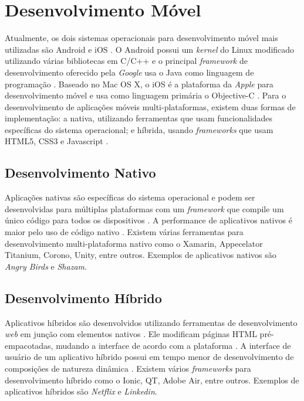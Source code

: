 \section{Desenvolvimento Móvel}

Atualmente, os dois sistemas operacionais para desenvolvimento móvel mais utilizadas são Android e iOS \cite{gartner-top-os}. O Android possui um \textit{kernel} do Linux modificado utilizando várias bibliotecas em C/C++ \cite{mobile-dev} e o principal \textit{framework} de desenvolvimento oferecido pela \textit{Google} usa o Java como linguagem de programação \cite{android}. Baseado no Mac OS X, o iOS é a plataforma da \textit{Apple} para desenvolvimento móvel e usa como linguagem primária o Objective-C \cite{mobile-dev}. Para o desenvolvimento de aplicações móveis multi-plataformas, existem duas formas de implementação: a nativa, utilizando ferramentas que usam funcionalidades específicas do sistema operacional; e híbrida, usando \textit{frameworks} que usam HTML5, CSS3 e Javascript \cite{mobile-dev-2}.

\subsection{Desenvolvimento Nativo}

Aplicações nativas são específicas do sistema operacional e podem ser desenvolvidas para múltiplas plataformas com um \textit{framework} que compile um único código para todos os dispositivos \cite{hybrid-1}. A performance de aplicativos nativos é maior pelo uso de código nativo \cite{hybrid-2}. Existem várias ferramentas para desenvolvimento multi-plataforma nativo como o Xamarin, Appecelator Titanium, Corono, Unity, entre outros. Exemplos de aplicativos nativos são \textit{Angry Birds} e \textit{Shazam}.

\subsection{Desenvolvimento Híbrido}

Aplicativos híbridos são desenvolvidos utilizando ferramentas de desenvolvimento \textit{web} em junção com elementos nativos \cite{hybrid-1}. Ele modificam páginas HTML pré-empacotadas, mudando a interface de acordo com a plataforma \cite{hybrid-2}. A interface de usuário de um aplicativo híbrido possui em tempo menor de desenvolvimento de composições de natureza dinâmica \cite{mobile-dev-2}. Existem vários \textit{frameworks} para desenvolvimento híbrido como o Ionic, QT, Adobe Air, entre outros. Exemplos de aplicativos híbridos são \textit{Netflix} e \textit{Linkedin}.
